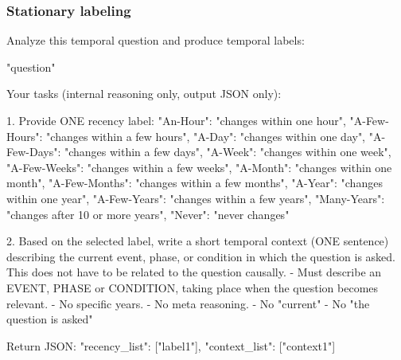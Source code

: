 \subsubsection{Stationary labeling}\label{prompt:label-stat}
\begin{promptblock}
Analyze this temporal question and produce temporal labels:

"{question}"

Your tasks (internal reasoning only, output JSON only):

1. Provide ONE recency label:
{
  "An-Hour": "changes within one hour",
  "A-Few-Hours": "changes within a few hours",
  "A-Day": "changes within one day",
  "A-Few-Days": "changes within a few days",
  "A-Week": "changes within one week",
  "A-Few-Weeks": "changes within a few weeks",
  "A-Month": "changes within one month",
  "A-Few-Months": "changes within a few months",
  "A-Year": "changes within one year",
  "A-Few-Years": "changes within a few years",
  "Many-Years": "changes after 10 or more years",
  "Never": "never changes"
}

2. Based on the selected label, write a short temporal context (ONE sentence) describing the current event, phase, or condition in which the question is asked. This does not have to be related to the question causally.
   - Must describe an EVENT, PHASE or CONDITION, taking place when the question becomes relevant.
   - No specific years.
   - No meta reasoning.
   - No "current"
   - No "the question is asked"

Return JSON:
{
  "recency_list": ["label1"],
  "context_list": ["context1"]
}
\end{promptblock}

